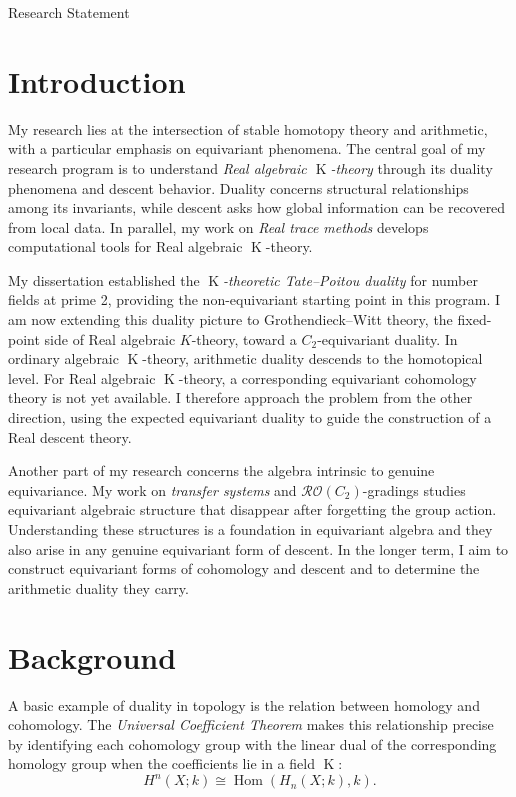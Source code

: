 \documentclass[11pt]{article}
\author{Myungsin Cho}
\date{}
\newcommand{\K}{\operatorname{K}}
\begin{document}
\begin{center}\LARGE{Research Statement}\end{center}\vspace{.5em}
\section*{Introduction}
My research lies at the intersection of stable homotopy theory and arithmetic, with a particular emphasis on equivariant phenomena.
The central goal of my research program is to understand \emph{Real algebraic $\K$-theory} through its duality phenomena and descent behavior.
Duality concerns structural relationships among its invariants, while descent asks how global information can be recovered from local data.
In parallel, my work on \emph{Real trace methods} develops computational tools for Real algebraic $\K$-theory.

My dissertation established the \emph{$\K$-theoretic Tate--Poitou duality} for number fields at prime 2, providing the non-equivariant starting point in this program. 
I am now extending this duality picture to Grothendieck--Witt theory, the fixed-point side of Real algebraic \(K\)-theory, toward a \(C_2\)-equivariant duality.
In ordinary algebraic $\K$-theory, arithmetic duality descends to the homotopical level. 
For Real algebraic $\K$-theory, a corresponding equivariant cohomology theory is not yet available. 
I therefore approach the problem from the other direction, using the expected equivariant duality to guide the construction of a Real descent theory.

Another part of my research concerns the algebra intrinsic to genuine equivariance. 
My work on \emph{transfer systems} and $\mathcal{RO}(C_2)$-gradings studies equivariant algebraic structure that disappear after forgetting the group action. 
Understanding these structures is a foundation in equivariant algebra and they also arise in any genuine equivariant form of descent. 
In the longer term, I aim to construct equivariant forms of cohomology and descent and to determine the arithmetic duality they carry.

\section{Background}
A basic example of duality in topology is the relation between homology and cohomology. 
The \emph{Universal Coefficient Theorem} makes this relationship precise by identifying each cohomology group with the linear dual of the corresponding homology group when the coefficients lie in a field $\K$:
\[
H^n(X;k)\cong \operatorname{Hom}(H_n(X;k),k).
\]
\end{document}
